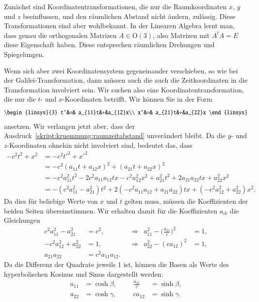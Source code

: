 Zunächst sind Koordinatentransformationen, die nur die Raumkoordinaten
$x$, $y$ und $z$ beeinflussen, und den räumlichen Abstand nicht
ändern, zulässig.
Diese Transformationen sind aber wohlbekannt.
In der Linearen Algebra lernt man, dass genau die orthogonalen
Matrizen $A\in \textrm{O}(3)$, also Matrizen mit $A^tA=E$ diese
Eigenschaft haben.
Diese entsprechen räumlichen Drehungen und Spiegelungen.

Wenn sich aber zwei Koordinatensystem gegeneinander verschieben,
so wie bei der Galilei-Transformation, dann müssen auch die auch
die Zeitkoordinaten in die Transformation involviert sein.
Wir suchen also eine Koordinatentransformation, die nur die
$t$- und $x$-Koordinaten betrifft.
Wir können Sie in der Form
\begin{equation}
\begin{linsys}{3}
t'&=& a_{11}t&+&a_{12}x\\
x'&=& a_{21}t&+&a_{22}x
\end{linsys}
\end{equation}
ansetzen.
Wir verlangen jetzt aber, dass der
Ausdruck~\eqref{skript:kruemmung:raumzeitabstand}
unverändert bleibt.
Da die $y$- und $z$-Koordinaten ohnehin nicht involviert sind, bedeutet
das, dass
\begin{align*}
-c^2t^2 + x^2
&=
-c^2t'^2 + x'^2
\\
&=
-c^2(a_{11}t+a_{12}x)^2 + (a_{21}t+a_{22}x)^2
\\
&=
-c^2a_{11}^2t^2 -2c^2a_{11}a_{12}tx -c^2a_{12}^2x^2
+a_{21}^2t^2+2a_{21}a_{22}tx+a_{22}^2x^2
\\
&=
-(c^2a_{11}^2 - a_{21}^2)t^2
+2(-c^2a_{11}a_{12}+a_{21}a_{22})tx
+(-c^2a_{12}^2 + a_{22}^2)x^2.
\end{align*}
Da dies für beliebige Werte von $x$ und $t$ gelten muss, müssen die
Koeffizienten der beiden Seiten übereinstimmen. 
Wir erhalten damit für die Koeffizienten $a_{ik}$ die Gleichungen
\[
\begin{aligned}
c^2a_{11}^2-a_{21}^2&=c^2,
&&\Rightarrow&
a_{11}^2
-
\biggl(\frac{a_{21}}{c}\biggr)^2
&=1,
\\
-c^2a_{12}^2+a_{22}^2&=1,
&&\Rightarrow
&
a_{22}^2 - (ca_{12})^2&=1,
\\
a_{21}a_{22}&=c^2a_{11}a_{12}.
\end{aligned}
\]
Da die Differenz der Quadrate jeweils $1$ ist, können die Basen
als Werte des hyperbolischen Kosinus und Sinus dargestellt werden:
\[
\begin{aligned}
a_{11}&=\cosh\beta, &&&\frac{a_{21}}{c}&=\sinh\beta,
\\
a_{22}&=\cosh\gamma,&&&ca_{12}&=\sinh\gamma.
\end{aligned}
\]

